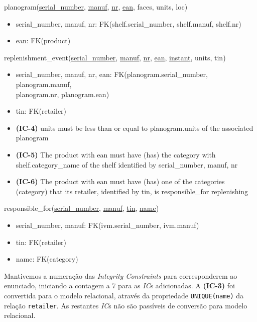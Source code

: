 \documentclass[12pt,a4paper]{article}
\begin{document}
  \vspace*{10pt}

  \noindent
  planogram(\underline{serial\_number}, \underline{manuf}, \underline{nr}, \underline{ean}, faces, units, loc)
  \begin{itemize}[nosep]
    \item serial\_number, manuf, nr: FK(shelf.serial\_number, shelf.manuf, shelf.nr)
    \item ean: FK(product)
  \end{itemize}

  \vspace*{10pt}

  \noindent
  replenishment\_event(\underline{serial\_number}, \underline{manuf}, \underline{nr}, \underline{ean}, \underline{instant}, units, tin)
  \begin{itemize}[nosep]
    \item serial\_number, manuf, nr, ean: FK(planogram.serial\_number, planogram.manuf,\\ planogram.nr, planogram.ean)
    \item tin: FK(retailer)
    \item \textsf{\textbf{(IC-4)}} units \textsf{must be less than or equal to} planogram.units \textsf{of the associated} planogram
    \item \textsf{\textbf{(IC-5)} The product with} ean \textsf{must have} (has) \textsf{the} category \textsf{with} shelf.category\_name \textsf{of the} shelf \textsf{identified by} serial\_number, manuf, nr
    \item \textsf{\textbf{(IC-6)} The product with} ean \textsf{must have} (has) \textsf{one of the categories} (category) \textsf{that its} retailer\textsf{, identified by} tin\textsf{, is} responsible\_for \textsf{replenishing}
    \end{itemize}

  \vspace*{10pt}

  \noindent
  responsible\_for(\underline{serial\_number}, \underline{manuf}, \underline{tin}, \underline{name})
  \begin{itemize}[nosep]
    \item serial\_number, manuf: FK(ivm.serial\_number, ivm.manuf)
    \item tin: FK(retailer)
    \item name: FK(category)
  \end{itemize}

  \sffamily
  \vspace*{10pt}
  \noindent
  Mantivemos a numeração das \textit{Integrity Constraints} para corresponderem ao enunciado, iniciando a contagem a 7 para as \textit{IC}s adicionadas.
  A \textbf{(IC-3)} foi convertida para o modelo relacional, através da propriedade \texttt{UNIQUE(name)} da relação \texttt{retailer}.
  As restantes \textit{IC}s não são passíveis de conversão para modelo relacional.
\end{document}
